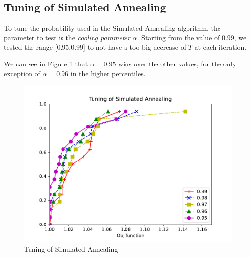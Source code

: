 \subsection{Tuning of Simulated Annealing}

To tune the probability used in the Simulated Annealing algorithm, the parameter to test is the \textit{cooling parameter} $\alpha$. Starting from the value of 0.99, we tested the range [0.95,0.99] to not have a too big decrease of $T$ at each iteration.

We can see in Figure \ref{fig:sa} that $\alpha = 0.95$ wins over the other values, for the only exception of $\alpha = 0.96$ in the higher percentiles.

\begin{figure}[!h]
    \centering
    \includegraphics[width=\textwidth]{images/sa.pdf}
    \caption{Tuning of Simulated Annealing}
    \label{fig:sa}
\end{figure}